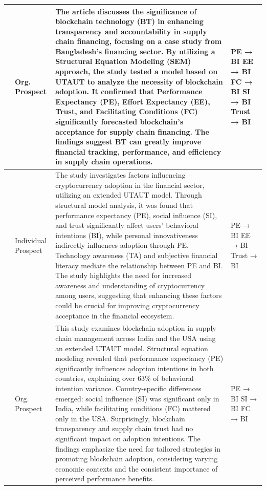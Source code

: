 \documentclass[twocolumn]{article}
\begin{document}
\begin{landscape}
\begin{longtable}{|p{1.7cm}|p{1.5cm}|p{17.7cm}|p{2.0cm}|}
\hline
\textcite{kabir_application_2021} & Org. Prospect & The article discusses the significance of blockchain technology (BT) in enhancing transparency and accountability in supply chain financing, focusing on a case study from Bangladesh's financing sector. By utilizing a Structural Equation Modeling (SEM) approach, the study tested a model based on UTAUT to analyze the necessity of blockchain adoption. It confirmed that Performance Expectancy (PE), Effort Expectancy (EE), Trust, and Facilitating Conditions (FC) significantly forecasted blockchain's acceptance for supply chain financing. The findings suggest BT can greatly improve financial tracking, performance, and efficiency in supply chain operations.  & PE → BI \newline EE → BI \newline FC → BI \newline SI → BI \newline Trust → BI \\
\hline
\textcite{kumari_impact_2022} & Individual Prospect & The study investigates factors influencing cryptocurrency adoption in the financial sector, utilizing an extended UTAUT model. Through structural model analysis, it was found that performance expectancy (PE), social influence (SI), and trust significantly affect users' behavioral intentions (BI), while personal innovativeness indirectly influences adoption through PE. Technology awareness (TA) and subjective financial literacy mediate the relationship between PE and BI. The study highlights the need for increased awareness and understanding of cryptocurrency among users, suggesting that enhancing these factors could be crucial for improving cryptocurrency acceptance in the financial ecosystem.  &  PE → BI \newline EE → BI \newline Trust → BI \\
\hline
\textcite{queiroz_blockchain_2019} & Org. Prospect & This study examines blockchain adoption in supply chain management across India and the USA using an extended UTAUT model. Structural equation modeling revealed that performance expectancy (PE) significantly influences adoption intentions in both countries, explaining over 63\% of behavioral intention variance. Country-specific differences emerged: social influence (SI) was significant only in India, while facilitating conditions (FC) mattered only in the USA. Surprisingly, blockchain transparency and supply chain trust had no significant impact on adoption intentions. The findings emphasize the need for tailored strategies in promoting blockchain adoption, considering varying economic contexts and the consistent importance of perceived performance benefits.  & PE → BI \newline SI → BI \newline FC → BI \\

\end{longtable}
\end{landscape}
\end{document}
